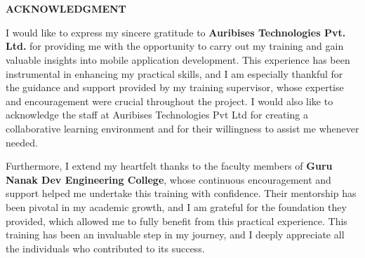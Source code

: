 \documentclass[12pt,a4paper]{report}
\begin{document}


\newpage


\chapter*{}
\begin{center}
    \textbf{ACKNOWLEDGMENT}
\end{center}
I would like to express my sincere gratitude to \textbf{Auribises Technologies Pvt. Ltd.} for providing me with the opportunity to carry out my training and gain valuable insights into mobile application development. This experience has been instrumental in enhancing my practical skills, and I am especially thankful for the guidance and support provided by my training supervisor, whose expertise and encouragement were crucial throughout the project. I would also like to acknowledge the staff at Auribises Technologies Pvt Ltd for creating a collaborative learning environment and for their willingness to assist me whenever needed.

Furthermore, I extend my heartfelt thanks to the faculty members of \textbf{Guru Nanak Dev Engineering College}, whose continuous encouragement and support helped me undertake this training with confidence. Their mentorship has been pivotal in my academic growth, and I am grateful for the foundation they provided, which allowed me to fully benefit from this practical experience. This training has been an invaluable step in my journey, and I deeply appreciate all the individuals who contributed to its success.
\end{document}
